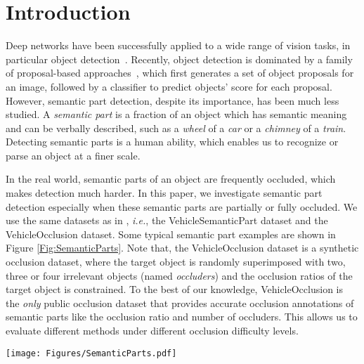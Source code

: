 \documentclass[10pt,twocolumn,letterpaper]{article}
\begin{document}
  \section{Introduction}
  \label{Introduction}

  Deep networks have been successfully applied to a wide range of vision tasks, in particular object detection~\cite{Girshick_2015_Fast,Ren_2015_Faster,redmon2016you,liu2016ssd, zhang2017single}. Recently, object detection is dominated by a family of proposal-based approaches~\cite{Girshick_2015_Fast,Ren_2015_Faster}, which first generates a set of object proposals for an image, followed by a classifier to predict objects' score for each proposal. However, semantic part detection, despite its importance, has been much less studied. A {\em semantic part} is a fraction of an object which has semantic meaning and can be verbally described, such as a {\em wheel} of a {\em car} or a {\em chimney} of a {\em train}. Detecting semantic parts is a human ability, which enables us to recognize or parse an object at a finer scale.

  In the real world, semantic parts of an object are frequently occluded, which makes detection much harder. In this paper, we investigate semantic part detection especially when these semantic parts are partially or fully occluded. We use the same datasets as in \cite{wang2017detecting}, {\em i.e.}, the VehicleSemanticPart dataset and the VehicleOcclusion dataset. Some typical semantic part examples are shown in Figure \ref{Fig:SemanticParts}. Note that, the VehicleOcclusion dataset is a synthetic occlusion dataset, where the target object is randomly superimposed with two, three or four irrelevant objects (named {\em occluders}) and the occlusion ratios of the target object is constrained. To the best of our knowledge, VehicleOcclusion is the {\em only} public occlusion dataset that provides accurate occlusion annotations of semantic parts like the occlusion ratio and number of occluders. This allows us to evaluate different methods under different occlusion difficulty levels.

  \begin{figure*}[ht!]
  \centering
  \texttt{[image: Figures/SemanticParts.pdf]}
  \caption{
  Typical semantic parts on six types of rigid objects from the VehicleSemanticPart dataset~\cite{wang2017detecting}. Some semantic parts ({\em e.g.}, {\em wheel}) can appear in different object classes, while some others ({\em e.g.}, {\em chimney}) only appear in one class ({\em train}).
  }
  \label{Fig:SemanticParts}
  \end{figure*}
\end{document}
